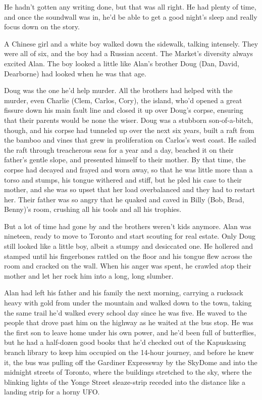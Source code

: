 He hadn't gotten any writing done, but that was all right.  He had
plenty of time, and once the soundwall was in, he'd be able to get a
good night's sleep and really focus down on the story.

A Chinese girl and a white boy walked down the sidewalk, talking
intensely.  They were all of six, and the boy had a Russian accent. 
The Market's diversity always excited Alan.  The boy looked a little
like Alan's brother Doug (Dan, David, Dearborne) had looked when he
was that age.

Doug was the one he'd help murder.  All the brothers had helped with
the murder, even Charlie (Clem, Carlos, Cory), the island, who'd
opened a great fissure down his main fault line and closed it up over
Doug's corpse, ensuring that their parents would be none the wiser. 
Doug was a stubborn son-of-a-bitch, though, and his corpse had
tunneled up over the next six years, built a raft from the bamboo and
vines that grew in proliferation on Carlos's west coast.  He sailed
the raft through treacherous seas for a year and a day, beached it on
their father's gentle slope, and presented himself to their mother. 
By that time, the corpse had decayed and frayed and worn away, so that
he was little more than a torso and stumps, his tongue withered and
stiff, but he pled his case to their mother, and she was so upset that
her load overbalanced and they had to restart her.  Their father was
so angry that he quaked and caved in Billy (Bob, Brad, Benny)'s room,
crushing all his tools and all his trophies.

But a lot of time had gone by and the brothers weren't kids anymore. 
Alan was nineteen, ready to move to Toronto and start scouting for
real estate.  Only Doug still looked like a little boy, albeit a
stumpy and desiccated one.  He hollered and stamped until his
fingerbones rattled on the floor and his tongue flew across the room
and cracked on the wall.  When his anger was spent, he crawled atop
their mother and let her rock him into a long, long slumber.

Alan had left his father and his family the next morning, carrying a
rucksack heavy with gold from under the mountain and walked down to
the town, taking the same trail he'd walked every school day since he
was five.  He waved to the people that drove past him on the highway
as he waited at the bus stop.  He was the first son to leave home
under his own power, and he'd been full of butterflies, but he had a
half-dozen good books that he'd checked out of the Kapuskasing branch
library to keep him occupied on the 14-hour journey, and before he
knew it, the bus was pulling off the Gardiner Expressway by the
SkyDome and into the midnight streets of Toronto, where the buildings
stretched to the sky, where the blinking lights of the Yonge Street
sleaze-strip receded into the distance like a landing strip for a
horny UFO.

